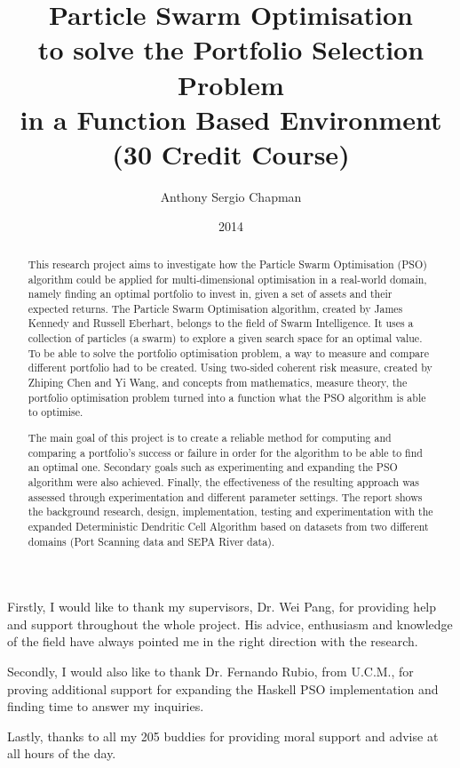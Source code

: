 \documentclass[bsc]{abdnthesis}
\title{Particle Swarm Optimisation \\ to solve the Portfolio Selection Problem \\ in a Function Based Environment \\ (30 Credit Course)}
\author{Anthony Sergio Chapman}
\date{2014}
\begin{document}

\maketitle
\makedeclaration


\begin{abstract}
  This research project aims to investigate how the Particle Swarm Optimisation (PSO) algorithm could be applied for multi-dimensional optimisation in a real-world domain, namely finding an optimal portfolio to invest in, given a set of assets and their expected returns. The Particle Swarm Optimisation algorithm, created by James Kennedy and Russell Eberhart, belongs to the field of Swarm Intelligence. It uses a collection of particles (a swarm) to explore a given search space for an optimal value. To be able to solve the portfolio optimisation problem, a way to measure and compare different portfolio had to be created. Using two-sided coherent risk measure, created by Zhiping Chen and Yi Wang, and concepts from mathematics, measure theory, the portfolio optimisation problem turned into a function what the PSO algorithm is able to optimise. 

  The main goal of this project is to create a reliable method for computing and comparing a portfolio's success or failure in order for the algorithm to be able to find an optimal one. Secondary goals such as experimenting and expanding the PSO algorithm were also achieved. Finally, the effectiveness of the resulting approach was assessed through experimentation and different parameter settings. The report shows the background research, design, implementation, testing and experimentation with the expanded Deterministic Dendritic Cell Algorithm based on datasets from two different domains (Port Scanning data and SEPA River data). 
\end{abstract}

\begin{acknowledgements}
  Firstly, I would like to thank my supervisors, Dr. Wei Pang, for providing help and support throughout the whole project. His advice, enthusiasm and knowledge of the field have always pointed me in the right direction with the research. 

  Secondly, I would also like to thank Dr. Fernando Rubio, from U.C.M., for proving additional support for expanding the Haskell PSO implementation and finding time to answer my inquiries. 

  Lastly, thanks to all my 205 buddies for providing moral support and advise at all hours of the day.
\end{acknowledgements}
\end{document}
